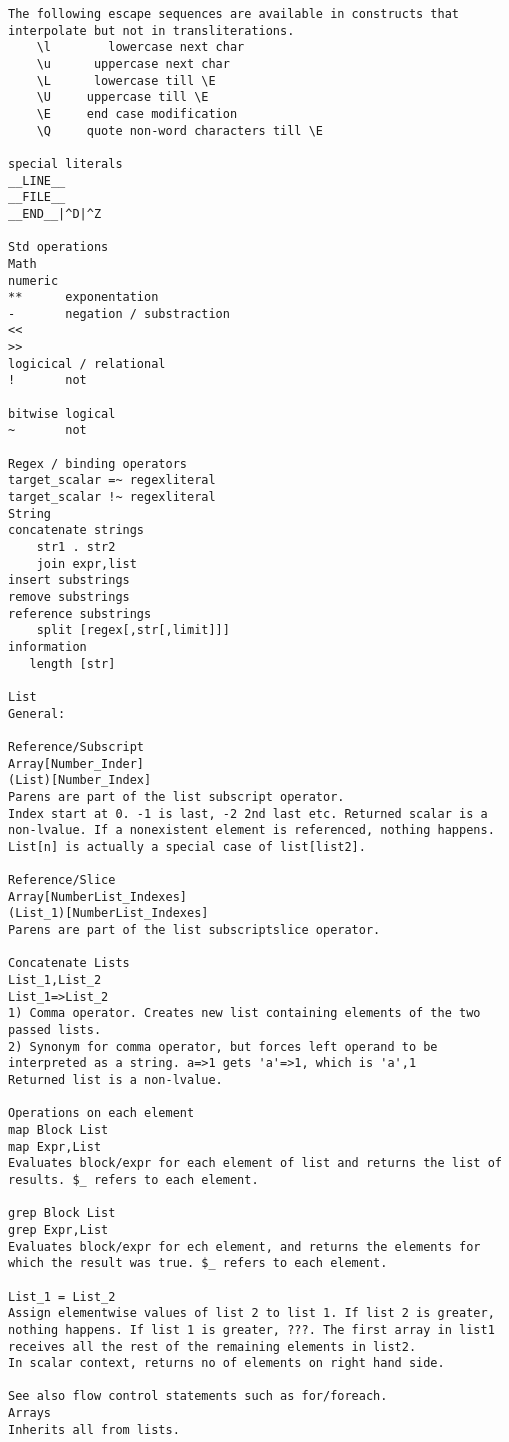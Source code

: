 \documentclass{article}
\begin{document}
\begin{description}
{\begin{verbatim}
The following escape sequences are available in constructs that interpolate but not in transliterations. 
    \l        lowercase next char
    \u      uppercase next char
    \L      lowercase till \E
    \U     uppercase till \E
    \E     end case modification
    \Q     quote non-word characters till \E

special literals
__LINE__
__FILE__
__END__|^D|^Z

Std operations
Math
numeric
**		exponentation
-		negation / substraction
<<
>>
logicical / relational
!		not

bitwise logical
~		not

Regex / binding operators
target_scalar =~ regexliteral
target_scalar !~ regexliteral
String
concatenate strings
    str1 . str2
    join expr,list
insert substrings
remove substrings
reference substrings
    split [regex[,str[,limit]]]
information
   length [str]

List
General:

Reference/Subscript
Array[Number_Inder]
(List)[Number_Index]		
Parens are part of the list subscript operator.
Index start at 0. -1 is last, -2 2nd last etc. Returned scalar is a non-lvalue. If a nonexistent element is referenced, nothing happens.
List[n] is actually a special case of list[list2]. 

Reference/Slice
Array[NumberList_Indexes]
(List_1)[NumberList_Indexes]
Parens are part of the list subscriptslice operator.

Concatenate Lists
List_1,List_2		
List_1=>List_2
1) Comma operator. Creates new list containing elements of the two passed lists.
2) Synonym for comma operator, but forces left operand to be interpreted as a string. a=>1 gets 'a'=>1, which is 'a',1
Returned list is a non-lvalue.

Operations on each element
map Block List
map Expr,List	
Evaluates block/expr for each element of list and returns the list of results. $_ refers to each element. 

grep Block List
grep Expr,List
Evaluates block/expr for ech element, and returns the elements for which the result was true. $_ refers to each element.

List_1 = List_2    
Assign elementwise values of list 2 to list 1. If list 2 is greater, nothing happens. If list 1 is greater, ???. The first array in list1 receives all the rest of the remaining elements in list2.
In scalar context, returns no of elements on right hand side.

See also flow control statements such as for/foreach. 
Arrays
Inherits all from lists.


\end{verbatim}}
\end{description}
\end{document}
